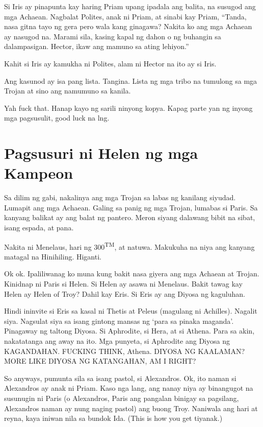 \documentclass[12pt,letterpaper]{report}
\begin{document}
Si Iris ay pinapunta kay haring Priam upang ipadala ang balita, na susugod ang mga Achaean. Nagbalat Polites, anak ni Priam, at sinabi kay Priam, ``Tanda, nasa gitna tayo ng gera pero wala kang ginagawa? Nakita ko ang mga Achaean ay nasugod na. Marami sila, kasing kapal ng dahon o ng buhangin sa dalampasigan. Hector, ikaw ang mamuno sa ating lehiyon.''

Kahit si Iris ay kamukha ni Polites, alam ni Hector na ito ay si Iris.

Ang kasunod ay isa pang lista. Tangina. Lista ng mga tribo na tumulong sa mga Trojan at sino ang namumuno sa kanila.

Yah fuck that. Hanap kayo ng sarili ninyong kopya. Kapag parte yan ng inyong mga pagsusulit, good luck na lng.

\pagebreak
\chapter{Pagsusuri ni Helen ng mga Kampeon}

Sa dilim ng gabi, nakalinya ang mga Trojan sa labas ng kanilang siyudad. Lumapit ang mga Achaean. Galing sa panig ng mga Trojan, lumabas si Paris. Sa kanyang balikat ay ang balat ng pantero. Meron siyang dalawang bibit na sibat, isang espada, at pana.

Nakita ni Menelaus, hari ng 300\textsuperscript{TM}, at natuwa. Makukuha na niya ang kanyang matagal na Hinihiling. Higanti.

Ok ok. Ipaliliwanag ko muna kung bakit nasa giyera ang mga Achaean at Trojan. Kinidnap ni Paris si Helen. Si Helen ay asawa ni Menelaus. Bakit tawag kay Helen ay Helen of Troy? Dahil kay Eris. Si Eris ay ang Diyosa ng kaguluhan.

Hindi ininvite si Eris sa kasal ni Thetis at Peleus (magulang ni Achilles). Nagalit siya. Nagsulat siya sa isang gintong mansas ng `para sa pinaka maganda'. Pinagaway ng taltong Diyosa. Si Aphrodite, si Hera, at si Athena. Para sa akin, nakatatanga ang away na ito. Mga punyeta, si Aphrodite ang Diyosa ng KAGANDAHAN. FUCKING THINK, Athena. DIYOSA NG KAALAMAN? MORE LIKE DIYOSA NG KATANGAHAN, AM I RIGHT?

So anyways, pumunta sila sa isang pastol, si Alexandros. Ok, ito naman si Alexandros ay anak ni Priam. Kaso nga lang, ang nanay niya ay binangugot na susunugin ni Paris (o Alexandros, Paris ang pangalan binigay sa pagsilang, Alexandros naman ay nung naging pastol) ang buong Troy. Naniwala ang hari at reyna, kaya iniwan nila sa bundok Ida. (This is how you get tiyanak.)
\end{document}
